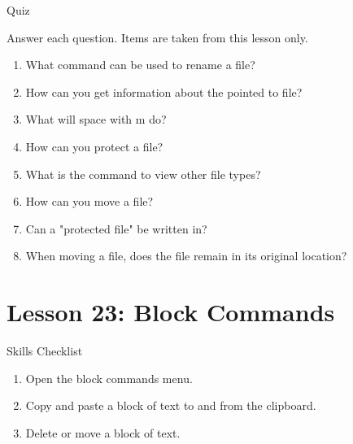 \documentclass[10pt,letterpaper,twoside]{report}
\begin{document}
{{{{\begin{enumerate}
	      Quiz
	      
	      
	      
	      Answer each question. Items are taken from this lesson only.
	      
	      
	      
	      \begin{enumerate}
		      \item What command can be used to rename a file?
		            
		      \item How can you get information about the pointed to file?
		            
		      \item What will space with m do?
		            
		      \item How can you protect a file?
		            
		      \item What is the command to view other file types?
		            
		      \item How can you move a file?
		            
		      \item Can a "protected file" be written in?
		            
		      \item When moving a file, does the file remain in its original location?
	      \end{enumerate}
	      
	      
	      
	      
	      
	      
\end{enumerate}\section*{Lesson 23: Block Commands}


Skills Checklist



\begin{enumerate}
	\item Open the block commands menu.
	      
	\item Copy and paste a block of text to and from the clipboard.
	      
	\item Delete or move a block of text.
	      

\end{enumerate}}}}}
\end{document}
